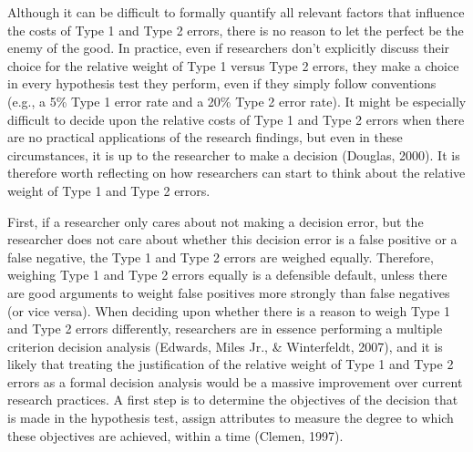 \documentclass[
  english,
  ,jou, a4paper,floatsintext]{apa6}
\begin{document}
Although it can be difficult to formally quantify all relevant factors that influence the costs of Type 1 and Type 2 errors, there is no reason to let the perfect be the enemy of the good. In practice, even if researchers don't explicitly discuss their choice for the relative weight of Type 1 versus Type 2 errors, they make a choice in every hypothesis test they perform, even if they simply follow conventions (e.g., a 5\% Type 1 error rate and a 20\% Type 2 error rate). It might be especially difficult to decide upon the relative costs of Type 1 and Type 2 errors when there are no practical applications of the research findings, but even in these circumstances, it is up to the researcher to make a decision (Douglas, 2000). It is therefore worth reflecting on how researchers can start to think about the relative weight of Type 1 and Type 2 errors.

First, if a researcher only cares about not making a decision error, but the researcher does not care about whether this decision error is a false positive or a false negative, the Type 1 and Type 2 errors are weighed equally. Therefore, weighing Type 1 and Type 2 errors equally is a defensible default, unless there are good arguments to weight false positives more strongly than false negatives (or vice versa). When deciding upon whether there is a reason to weigh Type 1 and Type 2 errors differently, researchers are in essence performing a multiple criterion decision analysis (Edwards, Miles Jr., \& Winterfeldt, 2007), and it is likely that treating the justification of the relative weight of Type 1 and Type 2 errors as a formal decision analysis would be a massive improvement over current research practices. A first step is to determine the objectives of the decision that is made in the hypothesis test, assign attributes to measure the degree to which these objectives are achieved, within a time (Clemen, 1997).
\end{document}
